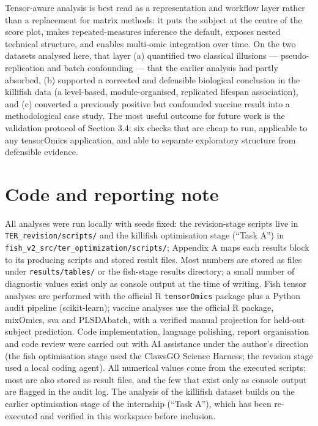 \documentclass[
]{article}
\begin{document}
Tensor-aware analysis is best read as a representation and workflow
layer rather than a replacement for matrix methods: it puts the subject
at the centre of the score plot, makes repeated-measures inference the
default, exposes nested technical structure, and enables multi-omic
integration over time. On the two datasets analysed here, that layer (a)
quantified two classical illusions --- pseudo-replication and batch
confounding --- that the earlier analysis had partly absorbed, (b)
supported a corrected and defensible biological conclusion in the
killifish data (a level-based, module-organised, replicated lifespan
association), and (c) converted a previously positive but confounded
vaccine result into a methodological case study. The most useful outcome
for future work is the validation protocol of Section 3.4: six checks
that are cheap to run, applicable to any tensorOmics application, and
able to separate exploratory structure from defensible evidence.

\section{Code and reporting note}\label{code-and-reporting-note}

All analyses were run locally with seeds fixed: the revision-stage
scripts live in \texttt{TER\_revision/scripts/} and the killifish
optimisation stage (``Task A'') in
\texttt{fish\_v2\_src/ter\_optimization/scripts/}; Appendix A maps each
results block to its producing scripts and stored result files. Most
numbers are stored as files under \texttt{results/tables/} or the
fish-stage results directory; a small number of diagnostic values exist
only as console output at the time of writing. Fish tensor analyses are
performed with the official R \texttt{tensorOmics} package plus a Python
audit pipeline (scikit-learn); vaccine analyses use the official R
package, mixOmics, sva and PLSDAbatch, with a verified manual projection
for held-out subject prediction. Code implementation, language
polishing, report organisation and code review were carried out with AI
assistance under the author's direction (the fish optimisation stage
used the ClawsGO Science Harness; the revision stage used a local coding
agent). All numerical values come from the executed scripts; most are
also stored as result files, and the few that exist only as console
output are flagged in the audit log. The analysis of the killifish
dataset builds on the earlier optimisation stage of the internship
(``Task A''), which has been re-executed and verified in this workspace
before inclusion.
\end{document}

